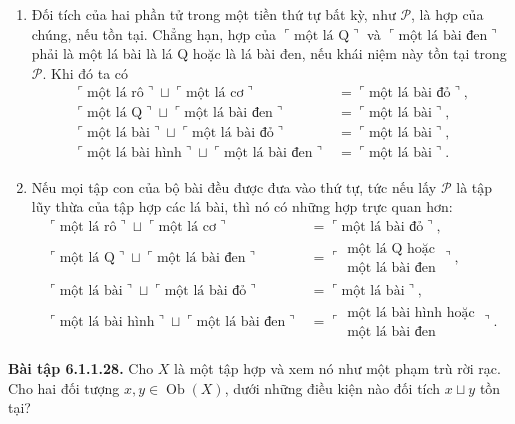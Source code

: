 \begin{enumerate}[label=\alph*.]
\item Đối tích của hai phần tử trong một tiền thứ tự bất kỳ, như $\mathcal P$, là hợp của chúng, nếu tồn tại. Chẳng hạn, hợp của $\ulcorner\text{một lá Q}\urcorner$ và $\ulcorner\text{một lá bài đen}\urcorner$ phải là một lá bài là lá Q hoặc là lá bài đen, nếu khái niệm này tồn tại trong $\mathcal P$. Khi đó ta có
\[\begin{aligned}\ulcorner\text{một lá rô}\urcorner\sqcup\ulcorner\text{một lá cơ}\urcorner&=\ulcorner\text{một lá bài đỏ}\urcorner,\\\ulcorner\text{một lá Q}\urcorner\sqcup\ulcorner\text{một lá bài đen}\urcorner&=\ulcorner\text{một lá bài}\urcorner,\\\ulcorner\text{một lá bài}\urcorner\sqcup\ulcorner\text{một lá bài đỏ}\urcorner&=\ulcorner\text{một lá bài}\urcorner,\\\ulcorner\text{một lá bài hình}\urcorner\sqcup\ulcorner\text{một lá bài đen}\urcorner&=\ulcorner\text{một lá bài}\urcorner.\end{aligned}\]
\item Nếu mọi tập con của bộ bài đều được đưa vào thứ tự, tức nếu lấy $\mathcal P$ là tập lũy thừa của tập hợp các lá bài, thì nó có những hợp trực quan hơn:
\[\begin{aligned}\ulcorner\text{một lá rô}\urcorner\sqcup\ulcorner\text{một lá cơ}\urcorner&=\ulcorner\text{một lá bài đỏ}\urcorner,\\\ulcorner\text{một lá Q}\urcorner\sqcup\ulcorner\text{một lá bài đen}\urcorner&=\ulcorner\substack{\text{một lá Q hoặc}\\\text{một lá bài đen}}\urcorner,\\\ulcorner\text{một lá bài}\urcorner\sqcup\ulcorner\text{một lá bài đỏ}\urcorner&=\ulcorner\text{một lá bài}\urcorner,\\\ulcorner\text{một lá bài hình}\urcorner\sqcup\ulcorner\text{một lá bài đen}\urcorner&=\ulcorner\substack{\text{một lá bài hình hoặc}\\\text{một lá bài đen}}\urcorner.\end{aligned}\]
\end{enumerate}

\noindent\textbf{Bài tập 6.1.1.28.} Cho $X$ là một tập hợp và xem nó như một phạm trù rời rạc. Cho hai đối tượng $x,y\in\operatorname{Ob}(X)$, dưới những điều kiện nào đối tích $x\sqcup y$ tồn tại?

